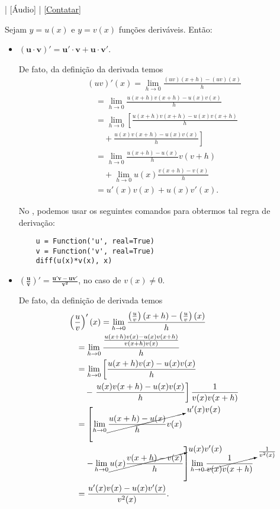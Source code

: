 \begin{flushright}
  [Vídeo] | [Áudio] | \href{https://phkonzen.github.io/notas/contato.html}{[Contatar]}
\end{flushright}

Sejam $y = u(x)$ e $y = v(x)$ funções deriváveis. Então:
\begin{itemize}
\item $\pmb{(u\cdot v)' = u'\cdot v+u\cdot v'}$.

  De fato, da definição da derivada temos
  \begin{align}
    & (uv)'(x) = \lim_{h\to 0} \frac{(uv)(x+h)-(uv)(x)}{h}\\
    & \text{}\quad = \lim_{h\to 0} \frac{u(x+h)v(x+h)-u(x)v(x)}{h}\\
    & \text{}\quad = \lim_{h\to 0} \left[\frac{u(x+h)v(x+h)-u(x)v(x+h)}{h}\right.\\
    & \text{}\qquad + \left.\frac{u(x)v(x+h)-u(x)v(x)}{h}\right]\\
    & \text{}\quad = \lim_{h\to 0} \frac{u(x+h)-u(x)}{h}v(v+h) \\
    & \text{}\qquad + \lim_{h\to 0} u(x)\frac{v(x+h)-v(x)}{h}\\
    & \text{}\quad = u'(x)v(x) + u(x)v'(x).
  \end{align}
  
  \ifispython
  No \sympy, podemos usar os seguintes comandos para obtermos tal regra de derivação:
  \begin{lstlisting}
    u = Function('u', real=True)
    v = Function('v', real=True)
    diff(u(x)*v(x), x)
  \end{lstlisting}
  \fi
  
\item $\displaystyle\pmb{\left(\frac{u}{v}\right)' = \frac{u'v-uv'}{v^2}}$, no caso de $v(x)\neq 0$.

  De fato, da definição de derivada temos
  \begin{align}
    & \left(\frac{u}{v}\right)'(x) = \lim_{h\to 0} \frac{\left(\frac{u}{v}\right)(x+h)-\left(\frac{u}{v}\right)(x)}{h} \\
    & \text{}\quad = \lim_{h\to 0} \frac{\frac{u(x+h)v(x)-u(x)v(x+h)}{v(x+h)v(x)}}{h}\\
    & \text{}\quad = \lim_{h\to 0} \left[\frac{u(x+h)v(x)-u(x)v(x)}{h}\right. \\
    & \text{}\qquad - \left.\frac{u(x)v(x+h)-u(x)v(x)}{h}\right]\frac{1}{v(x)v(x+h)}\\
    & \text{}\quad = \left[\lim_{h\to 0} \cancelto{u'(x)v(x)}{\frac{u(x+h)-u(x)}{h}v(x)}\right. \\
    & \text{}\qquad \left. - \lim_{h\to 0} \cancelto{u(x)v'(x)}{u(x)\frac{v(x+h)-v(x)}{h}}\right]\lim_{h\to 0} \cancelto{\frac{1}{v^2(x)}}{\frac{1}{v(x)v(x+h)}}\\
    & \text{}\quad = \frac{u'(x)v(x)-u(x)v'(x)}{v^2(x)}.
  \end{align}
  

\end{itemize}
